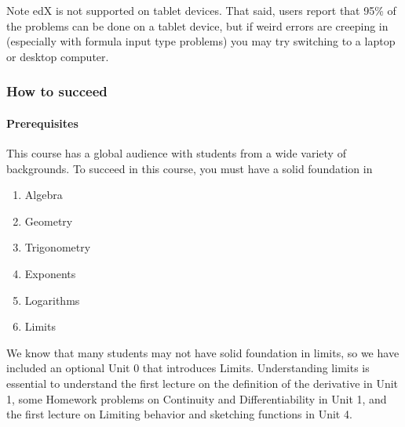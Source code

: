 \documentclass[pdftex, brazil, 12pt, twoside]{article}
\begin{document}
Note edX is not supported on tablet devices. That said, users report that 95\% of the problems can be done on a tablet device, but if weird errors are creeping in (especially with formula input type problems) you may try switching to a laptop or desktop computer.

\begin{figure}[H]
  \begin{center}
    \label{fig:latex2edx}
  \end{center}
\end{figure}
 
\subsubsection{How to succeed}
\label{gs-ol-succeed}

\paragraph{Prerequisites}
This course has a global audience with students from a wide variety of backgrounds. To succeed in this course, you must have a solid foundation in

\begin{enumerate}[noitemsep]
\item Algebra
\item Geometry
\item Trigonometry
\item Exponents
\item Logarithms
\item Limits
\end{enumerate}

We know that many students may not have solid foundation in limits, so we have included an optional Unit 0 that introduces Limits. Understanding limits is essential to understand the first lecture on the definition of the derivative in Unit 1, some Homework problems on Continuity and Differentiability in Unit 1, and the first lecture on Limiting behavior and sketching functions in Unit 4.
\end{document}

